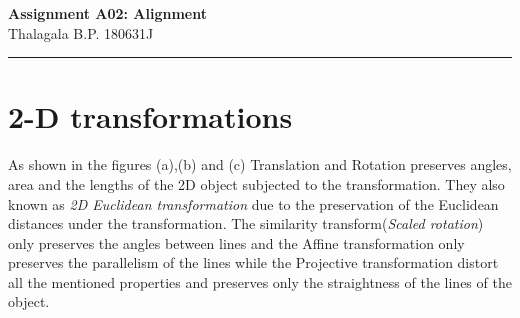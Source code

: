 \documentclass[a4paper,11pt]{article}%
\begin{document}
	\begin{center}
		{\large \textbf{Assignment A02: Alignment}}\\
		Thalagala B.P.\hspace{0.5cm} 180631J 
	\end{center}
	\hrule
\section{2-D transformations}
As shown in the figures (a),(b) and (c) Translation and Rotation  preserves angles, area and the lengths of the 2D object subjected to the transformation. They also known as \textit{2D Euclidean transformation} due to the preservation of the Euclidean distances under the transformation. The similarity transform(\textit{Scaled rotation}) only preserves the angles between lines and the Affine transformation only preserves the parallelism of the lines while the Projective transformation distort all the mentioned properties and preserves only the straightness of the lines of the object.
\end{document}
